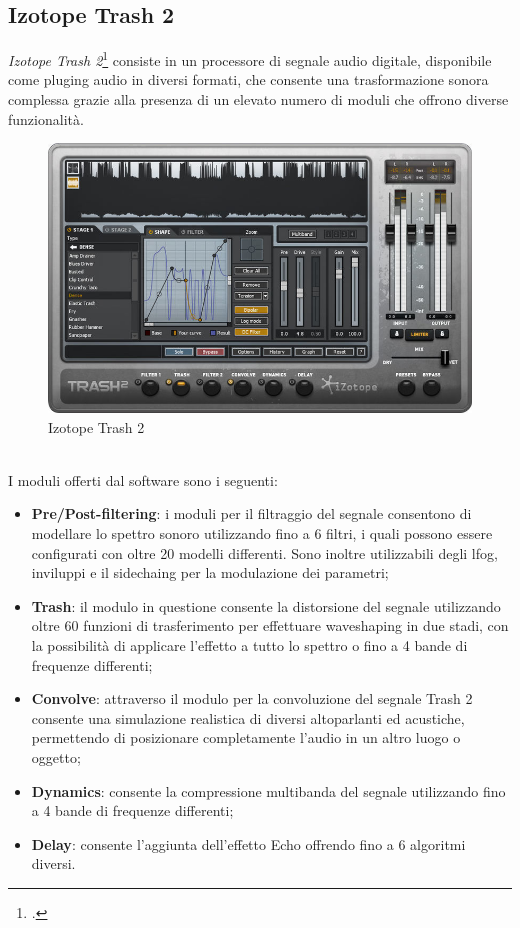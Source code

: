 \subsection*{Izotope Trash 2}
\noindent \textit{Izotope Trash 2}\footcite{site:trash2} consiste in un processore di segnale audio digitale, disponibile come \gls{pluging} audio in diversi formati, che consente una trasformazione sonora complessa grazie alla presenza di un elevato numero di moduli che offrono diverse funzionalità.
\begin{figure}[!h] 
    \centering 
    \includegraphics[width=0.8\columnwidth]{immagini/cap2/trash2.jpg}
    \caption{Izotope Trash 2}
\end{figure} \\
I moduli offerti dal software sono i seguenti:
\begin{itemize}
    \item \textbf{Pre/Post-filtering}: i moduli per il filtraggio del segnale consentono di modellare lo spettro sonoro utilizzando fino a 6 filtri, i quali possono essere configurati con oltre 20 modelli differenti. Sono inoltre utilizzabili degli \gls{lfog}, inviluppi e il \gls{sidechaing} per la modulazione dei parametri;
    \item \textbf{Trash}: il modulo in questione consente la distorsione del segnale utilizzando oltre 60 funzioni di trasferimento per effettuare waveshaping in due stadi, con la possibilità di applicare l'effetto a tutto lo spettro o fino a 4 bande di frequenze differenti;
    \item \textbf{Convolve}: attraverso il modulo per la convoluzione del segnale Trash 2 consente una simulazione realistica di diversi altoparlanti ed acustiche, permettendo di posizionare completamente l'audio in un altro luogo o oggetto;
    \item \textbf{Dynamics}: consente la compressione multibanda del segnale utilizzando fino a 4 bande di frequenze differenti;
    \item \textbf{Delay}: consente l'aggiunta dell'effetto Echo offrendo fino a 6 algoritmi diversi.
\end{itemize}

